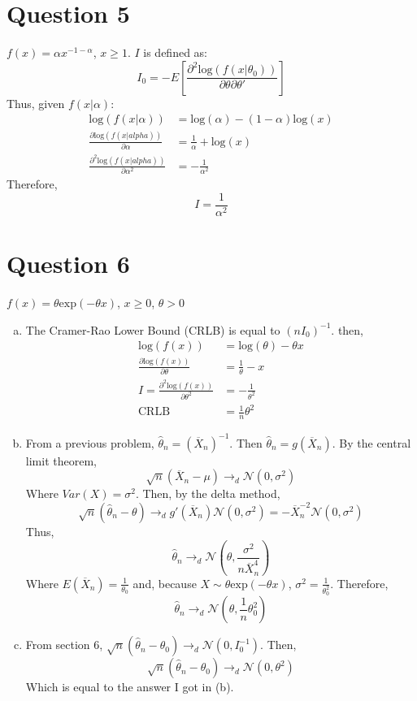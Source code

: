 \documentclass{article}
\newcommand{\N}{\mathcal{N}}
\newcommand{\olx}[1]{\overline{X}_{#1}}
\newcommand{\loge}[1]{\text{log}\left(#1\right)}
\begin{document}

\section*{Question 5}
$f(x)=\alpha x^{-1-\alpha}$, $x\geq 1$. $I$ is defined as:
\[
	I_0 = -E\left[\frac{\partial^2 \loge{f(x|\theta_0)}}{\partial\theta\partial\theta'}\right]
\]
Thus, given $f(x|\alpha)$:
\begin{align*}
	\loge{f(x|\alpha)} &= \loge{\alpha} - (1-\alpha)\loge{x}	\\
	\frac{\partial\loge{f(x|alpha)}}{\partial\alpha} &= \frac{1}{\alpha} + \loge{x}	\\
	\frac{\partial^2\loge{f(x|alpha)}}{\partial\alpha^2} &= -\frac{1}{\alpha^2}
\end{align*}
Therefore,
\[
	I = \frac{1}{\alpha^2}
\]



\section*{Question 6}
$f(x)=\theta\text{exp}(-\theta x)$, $x\geq 0$, $\theta > 0$
\begin{enumerate}[(a)]
	\item The Cramer-Rao Lower Bound (CRLB) is equal to $(nI_0)^{-1}$. then,
		\begin{align*}
			\loge{f(x)} &= \loge{\theta}-\theta x \\
			\frac{\partial\loge{f(x)}}{\partial\theta} &= \frac{1}{\theta}-x \\
		I =	\frac{\partial^2\loge{f(x)}}{\partial\theta^2} &= -\frac{1}{\theta^2}	\\
			\text{CRLB }&= \frac{1}{n}\theta^2
		\end{align*}
		
	\item From a previous problem, $\hat{\theta}_n=(\olx{n})^{-1}$. Then $\hat{\theta}_n=g(\olx{n})$. By the central limit theorem,
		\[
			\sqrt{n}(\olx{n}-\mu)\rightarrow_d\N(0,\sigma^2)
		\]
		Where $Var(X)=\sigma^2$. Then, by the delta method,
		\[
			\sqrt{n}(\hat{\theta}_n-\theta)\rightarrow_d g'(\olx{n})\N(0,\sigma^2) = -\olx{n}^{-2}\N(0,\sigma^2)
		\]
		Thus,
		\[
			\hat{\theta}_n\rightarrow_d\N\left(\theta,\frac{\sigma^2}{n\olx{n}^4}\right)
		\]
		Where $E(\olx{n})=\frac{1}{\theta_0}$ and, because $X\sim\theta\text{exp}(-\theta x)$, $\sigma^2=\frac{1}{\theta_0^2}$. Therefore,
		\[
			\hat{\theta}_n\rightarrow_d\N\left(\theta,\frac{1}{n}\theta_0^2\right)
		\]
		
	\item From section 6, $\sqrt{n}(\hat{\theta}_n-\theta_0)\rightarrow_d\N(0,I_0^{-1})$. Then,
		\[
			\sqrt{n}(\hat{\theta}_n-\theta_0)\rightarrow_d\N(0,\theta^2)
		\]
		Which is equal to the answer I got in (b).
\end{enumerate}
\end{document}
